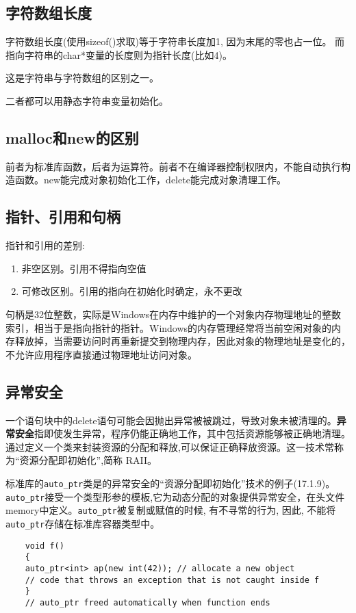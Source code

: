 \subsection{字符数组长度}
字符数组长度(使用sizeof()求取)等于字符串长度加1, 因为末尾的零也占一位。
而指向字符串的char*变量的长度则为指针长度(比如4)。

这是字符串与字符数组的区别之一。

二者都可以用静态字符串变量初始化。

\subsection{malloc和new的区别}
前者为标准库函数，后者为运算符。前者不在编译器控制权限内，不能自动执行构造函数。new能完成对象初始化工作，delete能完成对象清理工作。

\subsection{指针、引用和句柄}
指针和引用的差别:
\begin{enumerate}
    \item 非空区别。引用不得指向空值
    \item 可修改区别。引用的指向在初始化时确定，永不更改
\end{enumerate}

句柄是32位整数，实际是Windows在内存中维护的一个对象内存物理地址的整数索引，相当于是指向指针的指针。Windows的内存管理经常将当前空闲对象的内存释放掉，当需要访问时再重新提交到物理内存，因此对象的物理地址是变化的，不允许应用程序直接通过物理地址访问对象。

\subsection{异常安全}
一个语句块中的delete语句可能会因抛出异常被被跳过，导致对象未被清理的。\textbf{异常安全}指即使发生异常，程序仍能正确地工作，其中包括资源能够被正确地清理。通过定义一个类来封装资源的分配和释放,可以保证正确释放资源。这一技术常称为“资源分配即初始化”,简称 RAII。

标准库的\verb|auto_ptr|类是的异常安全的“资源分配即初始化”技术的例子(\cite{cppprimer}17.1.9)。\verb|auto_ptr|接受一个类型形参的模板,它为动态分配的对象提供异常安全，在头文件memory中定义。\verb|auto_ptr|被复制或赋值的时候, 有不寻常的行为, 因此, 不能将\verb|auto_ptr|存储在标准库容器类型中。

\begin{lstlisting}
    void f()
    {
	auto_ptr<int> ap(new int(42)); // allocate a new object
	// code that throws an exception that is not caught inside f
    }
    // auto_ptr freed automatically when function ends
\end{lstlisting}



















